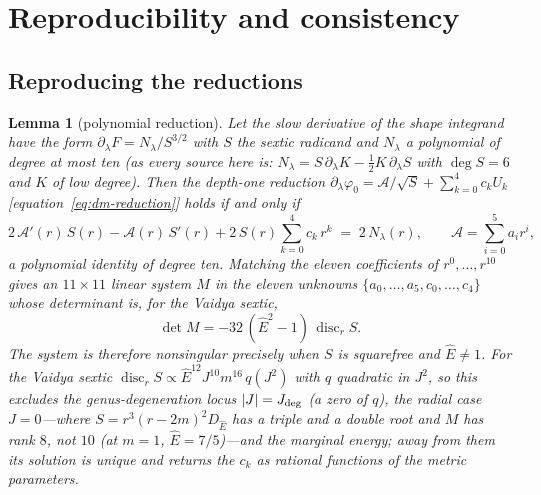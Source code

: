 \documentclass[12pt]{iopart}
\newcommand{\Ehat}{\hat E}
\newcommand{\Jc}{J_{\rm deg}}
\theoremstyle{plain}
\newtheorem{lemma}[theorem]{Lemma}
\theoremstyle{definition}
\theoremstyle{plain}
\theoremstyle{remark}
\newcommand{\Ithm}[1]{\setcounter{theorem}{\numexpr#1-1\relax}}
\begin{document}
\appendix
\section{Reproducibility and consistency}
\label{app:validation}

\subsection{Reproducing the reductions}
\label{app:reproduce}
\Ithm{4}
\begin{lemma}[polynomial reduction]\label{lem:reduction}
Let the slow derivative of the shape integrand have the form
$\partial_\lambda F=N_\lambda/S^{3/2}$ with $S$ the sextic radicand and $N_\lambda$ a
polynomial of degree at most ten (as every source here is: $N_\lambda=S\,\partial_\lambda K
-\tfrac12K\,\partial_\lambda S$ with $\deg S=6$ and $K$ of low degree). Then the depth-one reduction
$\partial_\lambda\varphi_0=\mathcal{A}/\sqrt S+\sum_{k=0}^4 c_k U_k$
[equation~\eqref{eq:dm-reduction}] holds if and only if
\begin{equation}
    2\,\mathcal{A}'(r)\,S(r)-\mathcal{A}(r)\,S'(r)
    +2\,S(r)\sum_{k=0}^4 c_k\,r^k \;=\; 2\,N_\lambda(r),
    \qquad \mathcal{A}=\sum_{i=0}^5 a_i r^i,
    \label{eq:reduction-identity}
\end{equation}
a polynomial identity of degree ten. Matching the eleven coefficients of
$r^0,\dots,r^{10}$ gives an $11\times11$ linear system $M$ in the eleven unknowns
$\{a_0,\dots,a_5,c_0,\dots,c_4\}$ whose determinant is, for the Vaidya sextic,
\begin{equation}
    \det M=-32\,(\Ehat^2-1)\,\operatorname{disc}_r S .
    \label{eq:det-disc}
\end{equation}
The system is therefore nonsingular precisely when $S$ is squarefree and $\Ehat\neq1$.
For the Vaidya sextic $\operatorname{disc}_rS\propto\Ehat^{12}J^{10}m^{16}\,q(J^2)$ with $q$
quadratic in $J^2$, so this excludes the genus-degeneration locus $|J|=\Jc$ (a zero of $q$),
the radial case $J=0$---where $S=r^3(r-2m)^2D_{\Ehat}$ has a triple and a double root and
$M$ has rank $8$, not $10$ (at $m=1$, $\Ehat=7/5$)---and the marginal energy; away from them its solution is unique and returns the $c_k$ as \emph{rational} functions of the
metric parameters.
\end{lemma}
\end{document}

